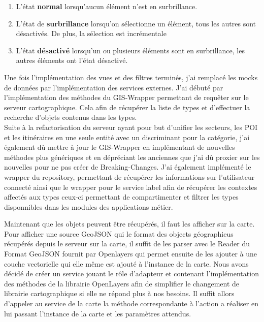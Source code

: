 \documentclass{rapportUHA40}
\begin{document}
\begin{enumerate}
  \item L'état \textbf{normal} lorsqu'aucun élément n'est en surbrillance.
  \item L'état de \textbf{surbrillance} lorsqu'on sélectionne un élément, tous les
        autres sont désactivés. De plus, la sélection est incrémentale
  \item L'état \textbf{désactivé} lorsqu'un ou plusieurs éléments sont en surbrillance,
        les autres éléments ont l'état désactivé.
\end{enumerate}

Une fois l'implémentation des vues et des filtres terminés, j'ai remplacé les
mocks de données par l'implémentation des services externes. J'ai débuté par
l'implémentation des méthodes du GIS-Wrapper permettant de requêter sur le
serveur cartographique. Cela afin de récupérer la liste de types et d'effectuer
la recherche d'objets contenus dans les types. \\

Suite à la refactorisation du serveur ayant pour but d'unifier les secteurs,
les POI et les itinéraires en une seule entité avec un discriminant pour la
catégorie, j'ai également dû mettre à jour le GIS-Wrapper en implémentant de
nouvelles méthodes plus génériques et en dépréciant les anciennes que j'ai dû
proxier sur les nouvelles pour ne pas créer de Breaking-Changes. J'ai également
implémenté le wrapper du repository, permettant de récupérer les informations
sur l'utilisateur connecté ainsi que le wrapper pour le service label afin de
récupérer les contextes affectés aux types ceux-ci permettant de compartimenter
et filtrer les types disponnibles dans les modules des applications métier.

Maintenant que les objets peuvent être récupérés, il faut les afficher sur la
carte. Pour afficher une source GeoJSON qui le format des objects géographieus
récupérés depuis le serveur sur la carte, il suffit de les parser avec le
Reader du Format GeoJSON fournit par Openlayers qui permet ensuite de les
ajouter à une couche vectorielle qui elle même est ajouté à l'instance de la
carte. Nous avons décidé de créer un service jouant le rôle d'adapteur et
contenant l'implémentation des méthodes de la librairie OpenLayers afin de
simplifier le changement de librairie cartographique si elle ne répond plus à
nos besoins. Il suffit allors d'appeler au service de la carte la méthode
correspondante à l'action a réaliser en lui passant l'instance de la carte et
les paramètres attendus.
\end{document}
